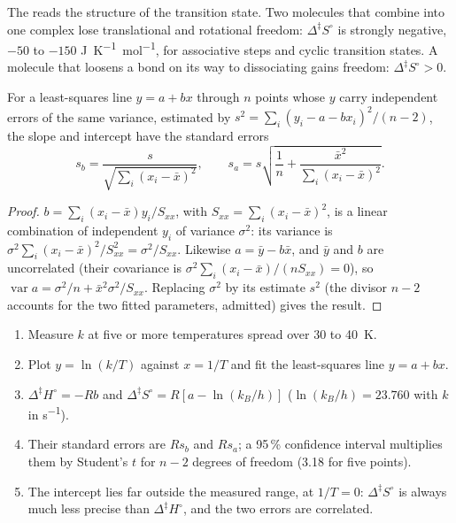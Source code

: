 The  reads the structure of the transition state. Two
molecules that combine into one complex lose translational and rotational
freedom: $\Delta^{\ddagger}S^\circ$ is strongly negative, $-50$ to $-150$ \unit{J.K^{-1}.mol^{-1}}, for
associative steps and cyclic transition states. A molecule that loosens a bond
on its way to dissociating gains freedom: $\Delta^{\ddagger}S^\circ > 0$.

\begin{proposition}\label{prop:b3:rate-theories:slope-uncertainty}
For a least-squares line $y = a + bx$ through $n$ points whose $y$ carry
independent errors of the same variance, estimated by $s^2 = \sum_i(y_i - a - bx_i)^2/(n - 2)$,
the slope and intercept have the standard errors
\[
  s_b = \frac{s}{\sqrt{\sum_i(x_i - \bar x)^2}}, \qquad
  s_a = s\sqrt{\frac1n + \frac{\bar x^2}{\sum_i(x_i - \bar x)^2}} .
\]
\end{proposition}

\begin{proof}
$b = \sum_i(x_i - \bar x)y_i/S_{xx}$, with $S_{xx} = \sum_i(x_i - \bar x)^2$, is a linear combination of
independent $y_i$ of variance $\sigma^2$: its variance is $\sigma^2\sum_i(x_i - \bar x)^2/S_{xx}^2 = \sigma^2/S_{xx}$.
Likewise $a = \bar y - b\bar x$, and $\bar y$ and $b$ are uncorrelated (their covariance is
$\sigma^2\sum_i(x_i - \bar x)/(nS_{xx}) = 0$), so $\operatorname{var}a = \sigma^2/n + \bar x^2\sigma^2/S_{xx}$. Replacing $\sigma^2$
by its estimate $s^2$ (the divisor $n - 2$ accounts for the two fitted
parameters, admitted) gives the result.
\end{proof}

\begin{method}\label{met:b3:rate-theories:eyring-plot}
\begin{enumerate}
  \item Measure $k$ at five or more temperatures spread over 30 to \qty{40}{K}.
  \item Plot $y = \ln(k/T)$ against $x = 1/T$ and fit the least-squares line $y = a + bx$.
  \item $\Delta^{\ddagger}H^\circ = -Rb$ and $\Delta^{\ddagger}S^\circ = R[a - \ln(k_B/h)]$ ($\ln(k_B/h) = 23.760$ with $k$ in
        \unit{s^{-1}}).
  \item Their standard errors are $Rs_b$ and $Rs_a$; a 95\,\% confidence interval
        multiplies them by Student's $t$ for $n - 2$ degrees of freedom (3.18 for
        five points).
  \item The intercept lies far outside the measured range, at $1/T = 0$: $\Delta^{\ddagger}S^\circ$
        is always much less precise than $\Delta^{\ddagger}H^\circ$, and the two errors are
        correlated.
\end{enumerate}
\end{method}

